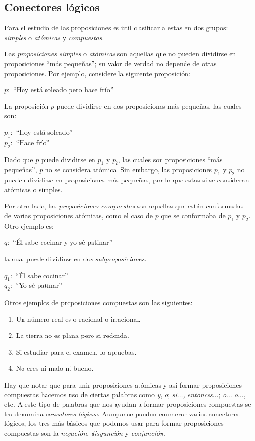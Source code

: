 \subsection{Conectores lógicos}
Para el estudio de las proposiciones es útil clasificar a estas en dos grupos: \emph{simples} o \emph{atómicas} y \emph{compuestas}.\par 
Las \emph{proposiciones simples} o \emph{atómicas} son aquellas que no pueden dividirse en proposiciones ``más pequeñas''; su valor de verdad no depende de otras proposiciones. Por ejemplo, considere la siguiente proposición:
\begin{center}
	$p:$ ``Hoy está soleado pero hace frío''
\end{center}
La proposición $p$ puede dividirse en dos proposiciones más pequeñas, las cuales son:
\begin{center}
	$p_{1}:$ ``Hoy está soleado''\\
	$p_{2}:$ ``Hace frío''
\end{center}
Dado que $p$ puede dividirse en $p_{1}$ y $p_{2}$, las cuales son proposiciones ``más pequeñas'', $p$ no se considera atómica. Sin embargo, las proposiciones $p_{1}$ y $p_{2}$ no pueden dividirse en proposiciones más pequeñas, por lo que estas si se consideran atómicas o simples.\par 
Por otro lado, las \emph{proposiciones compuestas} son aquellas que están conformadas de varias proposiciones atómicas, como el caso de $p$ que se conformaba de $p_{1}$ y $p_{2}$. Otro ejemplo es:
\begin{center}
	$q:$ ``Él sabe cocinar y yo sé patinar''
\end{center}
la cual puede dividirse en dos \emph{subproposiciones}:
\begin{center}
	$q_{1}:$ ``Él sabe cocinar''\\
	$q_{2}:$ ``Yo sé patinar''
\end{center}
Otros ejemplos de proposiciones compuestas son las siguientes:
\begin{enumerate}
	\item Un número real es o racional o irracional.
	\item La tierra no es plana pero si redonda.
	\item Si estudiar para el examen, lo apruebas.
	\item No eres ni malo ni bueno.
\end{enumerate}
Hay que notar que para unir proposiciones atómicas y así formar proposiciones compuestas hacemos uso de ciertas palabras como \emph{y}, \emph{o}; \emph{si$\ldots$, entonces$\ldots$}; \emph{o$\ldots$ o$\ldots$}, etc. A este tipo de palabras que nos ayudan a formar proposiciones compuestas se les denomina \emph{conectores lógicos}. Aunque se pueden enumerar varios conectores lógicos, los tres más básicos que podemos usar para formar proposiciones compuestas son la \emph{negación}, \emph{disyunción} y \emph{conjunción}.